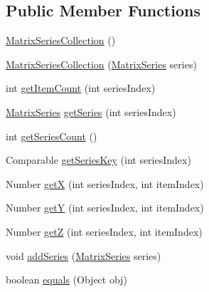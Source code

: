\subsection*{Public Member Functions}
\begin{DoxyCompactItemize}
\item 
\mbox{\hyperlink{classorg_1_1jfree_1_1data_1_1xy_1_1_matrix_series_collection_a3f8bd3279e3d195e82d53ac7be32f703}{Matrix\+Series\+Collection}} ()
\item 
\mbox{\hyperlink{classorg_1_1jfree_1_1data_1_1xy_1_1_matrix_series_collection_acf3ce2b3261eba0a93fc2a1b0e49175a}{Matrix\+Series\+Collection}} (\mbox{\hyperlink{classorg_1_1jfree_1_1data_1_1xy_1_1_matrix_series}{Matrix\+Series}} series)
\item 
int \mbox{\hyperlink{classorg_1_1jfree_1_1data_1_1xy_1_1_matrix_series_collection_a2dd853641a952363c53c352046efb240}{get\+Item\+Count}} (int series\+Index)
\item 
\mbox{\hyperlink{classorg_1_1jfree_1_1data_1_1xy_1_1_matrix_series}{Matrix\+Series}} \mbox{\hyperlink{classorg_1_1jfree_1_1data_1_1xy_1_1_matrix_series_collection_a6c19adfce1496e755a01302df102a62f}{get\+Series}} (int series\+Index)
\item 
int \mbox{\hyperlink{classorg_1_1jfree_1_1data_1_1xy_1_1_matrix_series_collection_a1020cb6d922bf7448263b04f3764efe3}{get\+Series\+Count}} ()
\item 
Comparable \mbox{\hyperlink{classorg_1_1jfree_1_1data_1_1xy_1_1_matrix_series_collection_adb198be708672b9d161209f0ef827be0}{get\+Series\+Key}} (int series\+Index)
\item 
Number \mbox{\hyperlink{classorg_1_1jfree_1_1data_1_1xy_1_1_matrix_series_collection_a3fbbf6d5deb2ec56a7778c3053da5ead}{getX}} (int series\+Index, int item\+Index)
\item 
Number \mbox{\hyperlink{classorg_1_1jfree_1_1data_1_1xy_1_1_matrix_series_collection_a7b873b64cb261ff072a480f22e29b505}{getY}} (int series\+Index, int item\+Index)
\item 
Number \mbox{\hyperlink{classorg_1_1jfree_1_1data_1_1xy_1_1_matrix_series_collection_a8e762b03fe7fad0234cf73eed0947d18}{getZ}} (int series\+Index, int item\+Index)
\item 
void \mbox{\hyperlink{classorg_1_1jfree_1_1data_1_1xy_1_1_matrix_series_collection_ada79eda39f9bdb099cc859cf8aea0ebc}{add\+Series}} (\mbox{\hyperlink{classorg_1_1jfree_1_1data_1_1xy_1_1_matrix_series}{Matrix\+Series}} series)
\item 
boolean \mbox{\hyperlink{classorg_1_1jfree_1_1data_1_1xy_1_1_matrix_series_collection_a0b0e130d35edf160015f7ecc190251b4}{equals}} (Object obj)

\end{DoxyCompactItemize}
